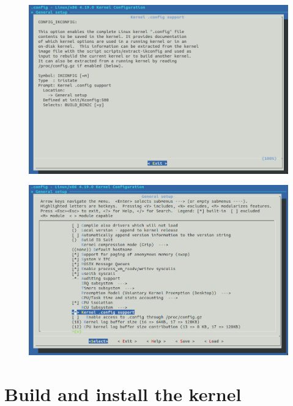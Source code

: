 \documentclass{beamer}
\begin{document}
\begin{frame}
  \begin{figure}[h!]
    \centering
    \includegraphics[scale=0.3]{images/proc-config-2.png}
  \end{figure}
\end{frame}


\begin{frame}
  \begin{figure}[h!]
    \centering
    \includegraphics[scale=0.3]{images/proc-config-3.png}
  \end{figure}
\end{frame}

\section{Build and install the kernel}
\end{document}
